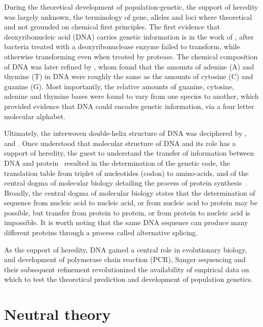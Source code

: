 During the theoretical development of population-genetic, the support of heredity was largely unknown, the terminology of gene, \glspl{allele} and loci where theoretical and not grounded on chemical first principles.
The first evidence that deoxyribonucleic acid (\acrshort{DNA}) carries genetic information is in the work of \citet{Avery1944}, after bacteria treated with a deoxyribonuclease enzyme failed to transform, while otherwise transforming even when treated by protease.
The chemical composition of \acrshort{DNA} was later refined by \citet{Chargaff1950}, whom found that the amounts of adenine (A) and thymine (T) in \acrshort{DNA} were roughly the same as the amounts of cytosine (C) and guanine (G).
Most importantly, the relative amounts of guanine, cytosine, adenine and thymine bases were found to vary from one species to another, which provided evidence that \acrshort{DNA} could encodes genetic information, via a four letter molecular alphabet.

Ultimately, the interwoven double-helix structure of \acrshort{DNA} was deciphered by \citet{franklin1953molecular}, \citet{watson1953molecular} and \citet{wilkins1953molecular}.
Once understood that molecular structure of \acrshort{DNA} and its role has a support of heredity, the guest to understand the transfer of information between \acrshort{DNA} and protein~\citep{Crick1958} resulted in the determination of the genetic code, the translation table from triplet of nucleotides (\gls{codon}) to amino-acids, and of the central dogma of molecular biology detailing the process of protein synthesis~\citep{Crick1970}.
Broadly, the central dogma of molecular biology states that the determination of sequence from nucleic acid to nucleic acid, or from nucleic acid to protein may be possible, but transfer from protein to protein, or from protein to nucleic acid is impossible.
It is worth noting that the same \acrshort{DNA} sequence can produce many different proteins through a process called alternative splicing.

As the support of heredity, \acrshort{DNA} gained a central role in evolutionary biology, and development of polymerase chain reaction (PCR), Sanger sequencing and their subsequent refinement revolutionized the availability of empirical data on which to test the theoretical prediction and development of population genetics.

\section{Neutral theory}

